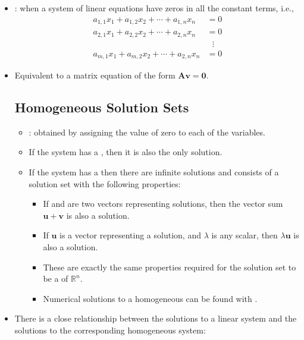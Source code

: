 \begin{itemize}
  \item {}: when a system of linear equations have zeros in all the constant terms, i.e.,
  \begin{align*}
    a_{1,1}x_1 + a_{1,2}x_2+\cdots+a_{1,n}x_n &=0 \\
    a_{2,1}x_1 + a_{2,2}x_2+\cdots+a_{2,n}x_n &=0 \\
    &\hspace{8pt}\vdots  \\
    a_{m,1}x_1 + a_{m,2}x_2+\cdots+a_{2,n}x_n &=0 
  \end{align*}
  \item Equivalent to a matrix equation of the form \(\bm{A}\bm{v}=\bm{0}\).
  
  \subsection{Homogeneous Solution Sets}\label{Homogeneous Solution Sets}
  \begin{itemize}
    \item {}: obtained by assigning the value of zero to each of the variables.
    \item If the system has a \hyperref[tbd]{}, then it is also the only solution.
    \item If the system has a \hyperref[tbd]{} then there are infinite solutions and consists of a solution set with the following properties:
    \begin{itemize}
      \item If  and  are two vectors representing solutions, then the vector sum \(\bm{u}+\bm{v}\) is also a solution.
      \item If \(\bm{u}\) is a vector representing a solution, and \(\lambda \) is any scalar, then \(\lambda \bm{u}\) is also a solution.
      \item These are exactly the same properties required for the solution set to be a \hyperref[Subspace]{} of \(\mathbb{R}^n\).
      \item Numerical solutions to a homogeneous can be found with \hyperref[tbd]{}.
    \end{itemize}
  \end{itemize}
  \bigskip
  \item There is a close relationship between the solutions to a linear system and the solutions to the corresponding homogeneous system: 

\end{itemize}
